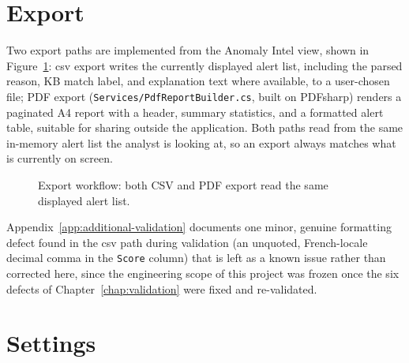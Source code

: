\section{Export}

Two export paths are implemented from the Anomaly Intel view, shown in Figure~\ref{fig:export-workflow}: \gls{csv} export writes the currently displayed alert list, including the parsed reason, KB match label, and explanation text where available, to a user-chosen file; PDF export (\texttt{Services/PdfReportBuilder.cs}, built on PDFsharp) renders a paginated A4 report with a header, summary statistics, and a formatted alert table, suitable for sharing outside the application. Both paths read from the same in-memory alert list the analyst is looking at, so an export always matches what is currently on screen.

\begin{figure}[H]
\centering
{}
\caption{Export workflow: both CSV and PDF export read the same displayed alert list.}
\label{fig:export-workflow}
\end{figure}

Appendix~\ref{app:additional-validation} documents one minor, genuine formatting defect found in the \gls{csv} path during validation (an unquoted, French-locale decimal comma in the \texttt{Score} column) that is left as a known issue rather than corrected here, since the engineering scope of this project was frozen once the six defects of Chapter~\ref{chap:validation} were fixed and re-validated.

\section{Settings}

